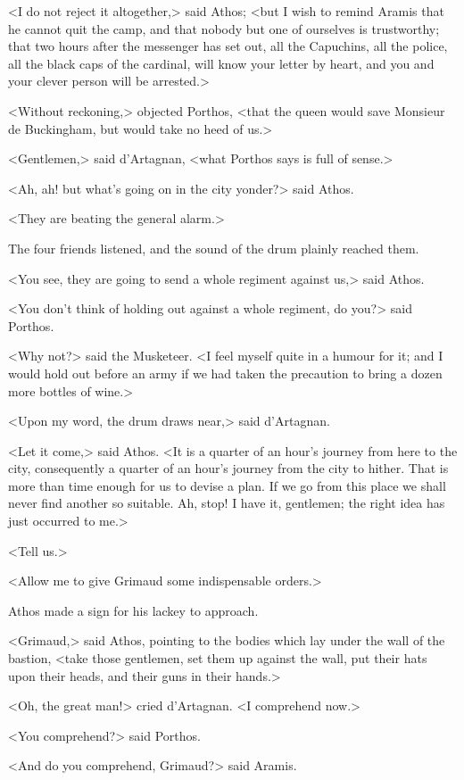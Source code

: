 <I do not reject it altogether,> said Athos; <but I wish to remind Aramis that he cannot quit the camp, and that nobody but one of ourselves is trustworthy; that two hours after the messenger has set out, all the Capuchins, all the police, all the black caps of the cardinal, will know your letter by heart, and you and your clever person will be arrested.> 

<Without reckoning,> objected Porthos, <that the queen would save Monsieur de Buckingham, but would take no heed of us.> 

<Gentlemen,> said d'Artagnan, <what Porthos says is full of sense.> 

<Ah, ah! but what's going on in the city yonder?> said Athos. 

<They are beating the general alarm.> 

The four friends listened, and the sound of the drum plainly reached them. 

<You see, they are going to send a whole regiment against us,> said Athos. 

<You don't think of holding out against a whole regiment, do you?> said Porthos. 

<Why not?> said the Musketeer. <I feel myself quite in a humour for it; and I would hold out before an army if we had taken the precaution to bring a dozen more bottles of wine.> 

<Upon my word, the drum draws near,> said d'Artagnan. 

<Let it come,> said Athos. <It is a quarter of an hour's journey from here to the city, consequently a quarter of an hour's journey from the city to hither. That is more than time enough for us to devise a plan. If we go from this place we shall never find another so suitable. Ah, stop! I have it, gentlemen; the right idea has just occurred to me.> 

<Tell us.> 

<Allow me to give Grimaud some indispensable orders.> 

Athos made a sign for his lackey to approach. 

<Grimaud,> said Athos, pointing to the bodies which lay under the wall of the bastion, <take those gentlemen, set them up against the wall, put their hats upon their heads, and their guns in their hands.> 

<Oh, the great man!> cried d'Artagnan. <I comprehend now.> 

<You comprehend?> said Porthos. 

<And do you comprehend, Grimaud?> said Aramis. 

